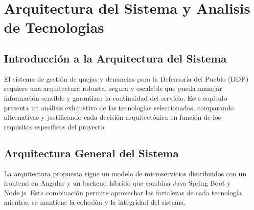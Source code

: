 \chapter{Arquitectura del Sistema y Analisis de Tecnologias}

\section{Introducción a la Arquitectura del Sistema}

El sistema de gestión de quejas y denuncias para la Defensoría del Pueblo (DDP) requiere una arquitectura robusta, segura y escalable que pueda manejar información sensible y garantizar la continuidad del servicio. Este capítulo presenta un análisis exhaustivo de las tecnologías seleccionadas, comparando alternativas y justificando cada decisión arquitectónica en función de los requisitos específicos del proyecto.

\section{Arquitectura General del Sistema}

La arquitectura propuesta sigue un modelo de microservicios distribuidos con un frontend en Angular y un backend híbrido que combina Java Spring Boot y Node.js. Esta combinación permite aprovechar las fortalezas de cada tecnología mientras se mantiene la cohesión y la integridad del sistema.

